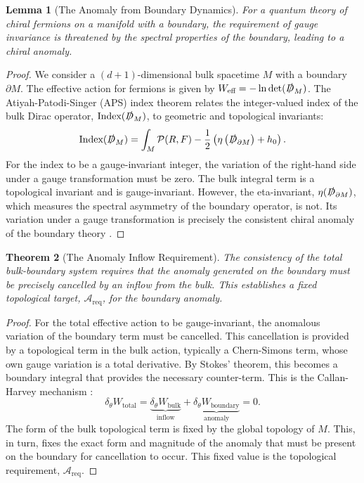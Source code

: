 \documentclass[11pt, letterpaper]{report}
\theoremstyle{plain} %
\newtheorem{theorem}{Theorem}[chapter]
\newtheorem{lemma}[theorem]{Lemma}
\theoremstyle{definition} %
\theoremstyle{remark} %
\newcommand{\BulkM}{M}
\newcommand{\BoundaryM}{\partial\BulkM}
\newcommand{\DiracOpBulk}{\slashed{D}_{\BulkM}}
\newcommand{\DiracOpBoundary}{\slashed{D}_{\BoundaryM}}
\newcommand{\EtaInv}{\eta}
\newcommand{\Index}{\text{Index}}
\begin{document}
\begin{lemma}[The Anomaly from Boundary Dynamics]
\label{lemma:aps_and_anomaly}
For a quantum theory of chiral fermions on a manifold with a boundary, the requirement of gauge invariance is threatened by the spectral properties of the boundary, leading to a chiral anomaly.
\end{lemma}
\begin{proof}
We consider a $(d+1)$-dimensional bulk spacetime $\BulkM$ with a boundary $\BoundaryM$. The effective action for fermions is given by $W_{\text{eff}} = -\ln\det(\DiracOpBulk)$. The Atiyah-Patodi-Singer (APS) index theorem \cite{AtiyahPatodiSinger1975} relates the integer-valued index of the bulk Dirac operator, $\Index(\DiracOpBulk)$, to geometric and topological invariants:
\begin{equation}
    \Index(\DiracOpBulk) = \int_{\BulkM} \mathcal{P}(R,F) - \frac{1}{2}\left(\EtaInv\left(\DiracOpBoundary\right) + h_0\right).
\end{equation}
For the index to be a gauge-invariant integer, the variation of the right-hand side under a gauge transformation must be zero. The bulk integral term is a topological invariant and is gauge-invariant. However, the eta-invariant, $\EtaInv(\DiracOpBoundary)$, which measures the spectral asymmetry of the boundary operator, is not. Its variation under a gauge transformation is precisely the consistent chiral anomaly of the boundary theory \cite{AlvarezGaume1985Anomalies}.
\end{proof}

\begin{theorem}[The Anomaly Inflow Requirement]
\label{thm:anomaly_inflow_req}
The consistency of the total bulk-boundary system requires that the anomaly generated on the boundary must be precisely cancelled by an inflow from the bulk. This establishes a fixed topological target, $\mathcal{A}_{\text{req}}$, for the boundary anomaly.
\end{theorem}
\begin{proof}
For the total effective action to be gauge-invariant, the anomalous variation of the boundary term must be cancelled. This cancellation is provided by a topological term in the bulk action, typically a Chern-Simons term, whose own gauge variation is a total derivative. By Stokes' theorem, this becomes a boundary integral that provides the necessary counter-term. This is the Callan-Harvey mechanism \cite{CallanHarvey1985}:
\begin{equation}
    \delta_\theta W_{\text{total}} = \underbrace{\delta_\theta W_{\text{bulk}}}_{\text{inflow}} + \underbrace{\delta_\theta W_{\text{boundary}}}_{\text{anomaly}} = 0.
\end{equation}
The form of the bulk topological term is fixed by the global topology of $\BulkM$. This, in turn, fixes the exact form and magnitude of the anomaly that must be present on the boundary for cancellation to occur. This fixed value is the topological requirement, $\mathcal{A}_{\text{req}}$.
\end{proof}
\end{document}
